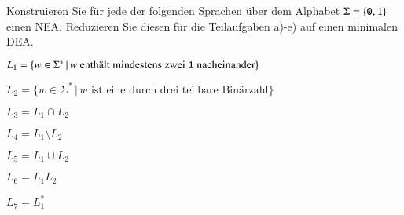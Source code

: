 Konstruieren Sie für jede der folgenden Sprachen über dem Alphabet
$\Sigma=\{{\tt 0},{\tt 1}\}$ einen NEA. Reduzieren Sie diesen für die
Teilaufgaben a)-e) auf einen minimalen DEA.
\begin{teilaufgaben}
\item $L_1=\{w\in\Sigma^*\,|\,\text{$w$ enthält mindestens zwei {\tt 1} nacheinander}\}$
\item $L_2=\{w\in\Sigma^*\,|\,\text{$w$ ist eine durch drei teilbare Binärzahl}\}$
\item $L_3=L_1\cap L_2$
\item $L_4=L_1\setminus L_2$
\item $L_5=L_1\cup L_2$
\item $L_6=L_1L_2$
\item $L_7=L_1^*$
\end{teilaufgaben}


